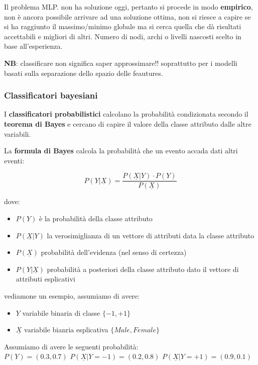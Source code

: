 Il problema MLP. non ha soluzione oggi, pertanto si procede in modo \textbf{empirico}, non \`e ancora possibile arrivare ad una soluzione ottima, non si riesce a capire se si ha raggiunto il massimo/minimo globale ma si cerca quella che dà risultati accettabili e migliori di altri. Numero di nodi, archi o livelli nascosti scelto in base all'esperienza.

\textbf{NB}: classificare non significa saper approssimare!! soprattutto per i modelli basati sulla separazione dello spazio delle feautures.

\subsubsection{Classificatori bayesiani}
I \textbf{classificatori probabilistici} calcolano la probabilit\`a condizionata secondo il \textbf{teorema di Bayes} e cercano di capire il valore della classe attributo dalle altre variabili. 

\begin{defn}

La \textbf{formula di Bayes} calcola la probabilità che un evento accada dati altri eventi: 

\[P(Y|\underline{X}) = \frac{P(\underline{X}|Y) \cdot P(Y)}{P(\underline{X})}\]

dove:
\begin{itemize}
	\item $P(Y)$ è la probabilit\`a della classe attributo
	\item $P(\underline{X}|Y)$ la verosimiglianza di un vettore di attributi data la classe attributo
	\item $P(\underline{X})$ probabilit\`a dell'evidenza (nel senso di certezza)
	\item $P(Y|\underline{X})$ probabilit\`a a posteriori della classe attributo dato il vettore di attributi esplicativi
\end{itemize}

vediamone un esempio, assumiamo di avere:
\begin{itemize}
	\item $Y$ variabile binaria di classe $\{-1,+1\}$
	\item $\underline{X}$ variabile bianria esplicativa $\{Male, Female\}$
\end{itemize}
\end{defn}
Assumiamo di avere le seguenti probabilità: 
\\
$P(Y) = (0.3,0.7)$ \quad $P(\underline{X}|Y=-1) = (0.2,0.8)$ \quad $P(\underline{X}|Y = +1) = (0.9,0.1)$

